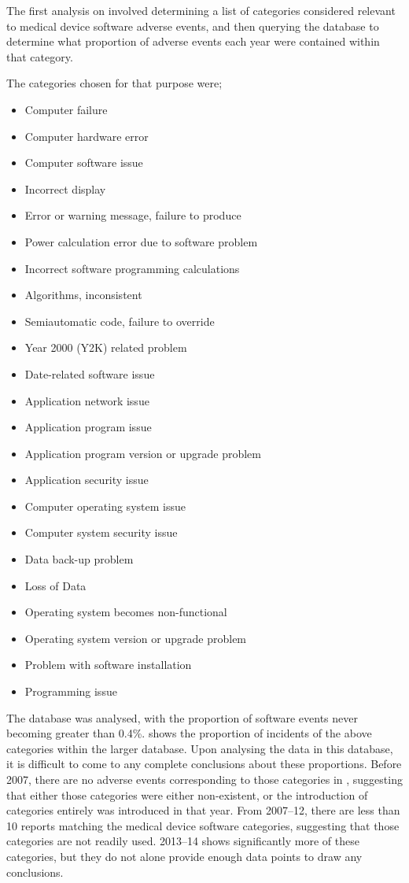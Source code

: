 \documentclass{cshonours}
\begin{document}
The first analysis on \maude involved determining a list of categories considered relevant to medical device software adverse events, and then querying the database to determine what proportion of adverse events each year were contained within that category. 

The categories chosen for that purpose were;
\begin{multicols}{2}
{\smaller
\begin{itemize}
  \item Computer failure
  \item Computer hardware error
  \item Computer software issue
  \item Incorrect display
  \item Error or warning message, failure to produce
  \item Power calculation error due to software problem
  \item Incorrect software programming calculations
  \item Algorithms, inconsistent
  \item Semiautomatic code, failure to override
  \item Year 2000 (Y2K) related problem
  \item Date-related software issue
  \item Application network issue
  \item Application program issue
  \item Application program version or upgrade problem
  \item Application security issue
  \item Computer operating system issue
  \item Computer system security issue
  \item Data back-up problem
  \item Loss of Data
  \item Operating system becomes non-functional
  \item Operating system version or upgrade problem
  \item Problem with software installation
  \item Programming issue
\end{itemize}
}
\end{multicols}

The database was analysed, with the proportion of software events never becoming greater than 0.4\%.  shows the proportion of incidents of the above categories within the larger database. Upon analysing the data in this database, it is difficult to come to any complete conclusions about these proportions. Before 2007, there are no adverse events corresponding to those categories in \maude, suggesting that either those categories were either non-existent, or the introduction of categories entirely was introduced in that year. From 2007--12, there are less than 10 reports matching the medical device software categories, suggesting that those categories are not readily used. 2013--14 shows significantly more of these categories, but they do not alone provide enough data points to draw any conclusions.
\end{document}

